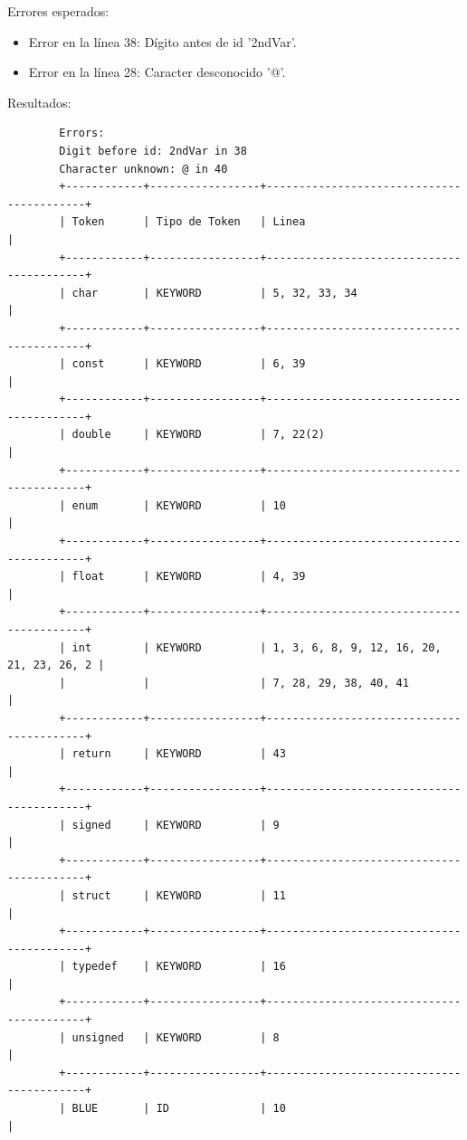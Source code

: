 \documentclass[a4paper,12pt]{article}
\begin{document}
\begin{flushleft}
\begin{verbatim}
	\end{verbatim}
	Errores esperados:
	\begin{itemize}
		\item Error en la línea 38: Dígito antes de id '2ndVar'.
		\item Error en la línea 28: Caracter desconocido '@'.
	\end{itemize}
	Resultados:
	\begin{verbatim}
		Errors: 
		Digit before id: 2ndVar in 38
		Character unknown: @ in 40
		+------------+-----------------+------------------------------------------+
		| Token      | Tipo de Token   | Linea                                    |
		+------------+-----------------+------------------------------------------+
		| char       | KEYWORD         | 5, 32, 33, 34                            |
		+------------+-----------------+------------------------------------------+
		| const      | KEYWORD         | 6, 39                                    |
		+------------+-----------------+------------------------------------------+
		| double     | KEYWORD         | 7, 22(2)                                 |
		+------------+-----------------+------------------------------------------+
		| enum       | KEYWORD         | 10                                       |
		+------------+-----------------+------------------------------------------+
		| float      | KEYWORD         | 4, 39                                    |
		+------------+-----------------+------------------------------------------+
		| int        | KEYWORD         | 1, 3, 6, 8, 9, 12, 16, 20, 21, 23, 26, 2 |
		|            |                 | 7, 28, 29, 38, 40, 41                    |
		+------------+-----------------+------------------------------------------+
		| return     | KEYWORD         | 43                                       |
		+------------+-----------------+------------------------------------------+
		| signed     | KEYWORD         | 9                                        |
		+------------+-----------------+------------------------------------------+
		| struct     | KEYWORD         | 11                                       |
		+------------+-----------------+------------------------------------------+
		| typedef    | KEYWORD         | 16                                       |
		+------------+-----------------+------------------------------------------+
		| unsigned   | KEYWORD         | 8                                        |
		+------------+-----------------+------------------------------------------+
		| BLUE       | ID              | 10                                       |

\end{verbatim}
\end{flushleft}
\end{document}
